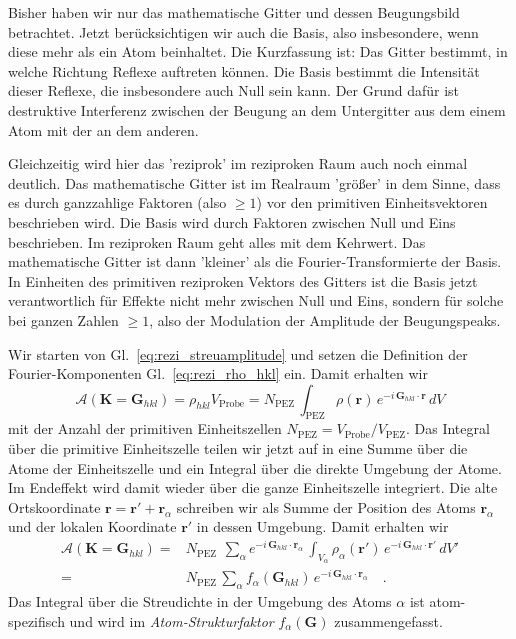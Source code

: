 Bisher haben wir nur das mathematische Gitter und dessen Beugungsbild betrachtet. Jetzt berücksichtigen wir auch die Basis, also insbesondere, wenn diese mehr als ein Atom beinhaltet. Die Kurzfassung ist: Das Gitter bestimmt, in welche Richtung Reflexe auftreten können. Die Basis bestimmt die Intensität dieser Reflexe, die insbesondere auch Null sein kann. Der Grund dafür ist destruktive Interferenz zwischen der Beugung an dem Untergitter aus dem einem Atom mit der an dem anderen.

Gleichzeitig wird hier das 'reziprok' im reziproken Raum auch noch einmal deutlich. Das mathematische Gitter ist im Realraum 'größer' in dem Sinne, dass es durch ganzzahlige Faktoren (also $\ge 1$) vor den primitiven Einheitsvektoren beschrieben wird. Die Basis wird durch Faktoren zwischen Null und Eins beschrieben. Im reziproken Raum geht alles mit dem Kehrwert. Das mathematische Gitter ist dann 'kleiner' als die Fourier-Transformierte der Basis. In Einheiten des primitiven reziproken Vektors des Gitters ist die Basis jetzt verantwortlich für Effekte nicht mehr zwischen Null und Eins, sondern für solche bei ganzen Zahlen $\ge 1$, also der Modulation der Amplitude der Beugungspeaks.

Wir starten von Gl.~\ref{eq:rezi_streuamplitude} und setzen die Definition der Fourier-Komponenten Gl.~\ref{eq:rezi_rho_hkl} ein. Damit erhalten wir
\begin{equation}
\mathcal{A}(\mathbf{K} = \mathbf{G}_{hkl} ) 
=  \rho_{hkl} V_\text{Probe}
=  N_\text{PEZ} \, \int_\text{PEZ}    \rho(\mathbf{r})\,  e^{-i \, \mathbf{G}_{hkl} \cdot \mathbf{r}} \, dV 
\end{equation}
mit der Anzahl der primitiven Einheitszellen $ N_\text{PEZ} =  V_\text{Probe} / V_\text{PEZ}$.
Das Integral über die primitive Einheitszelle teilen wir jetzt auf in eine Summe über die Atome der Einheitszelle und ein Integral über die direkte Umgebung der Atome. Im Endeffekt wird damit wieder über die ganze Einheitszelle integriert. Die alte Ortskoordinate  $\mathbf{r} =  \mathbf{r}' +  \mathbf{r}_\alpha$ schreiben wir als Summe der Position des Atoms  $\mathbf{r}_\alpha$ und der lokalen Koordinate $\mathbf{r}'$ in dessen Umgebung. Damit erhalten wir
\begin{align}
\mathcal{A}(\mathbf{K} = \mathbf{G}_{hkl} ) 
=   &  N_\text{PEZ}  \, \
\sum_\alpha e^{-i \, \mathbf{G}_{hkl} \cdot \mathbf{r}_\alpha} \, \int_{V_\alpha}  
 \rho_\alpha(\mathbf{r'})\,  e^{-i \, \mathbf{G}_{hkl} \cdot \mathbf{r'}} \, dV' \\
 = &
 N_\text{PEZ} \, 
\sum_\alpha f_\alpha ( \mathbf{G}_{hkl} ) \, e^{-i \, \mathbf{G}_{hkl} \cdot \mathbf{r}_\alpha}   \quad .
\end{align}
Das Integral über die Streudichte in der Umgebung des Atoms $\alpha$ ist atom-spezifisch und wird im \emph{Atom-Strukturfaktor} $f_\alpha ( \mathbf{G} )$ zusammengefasst.

